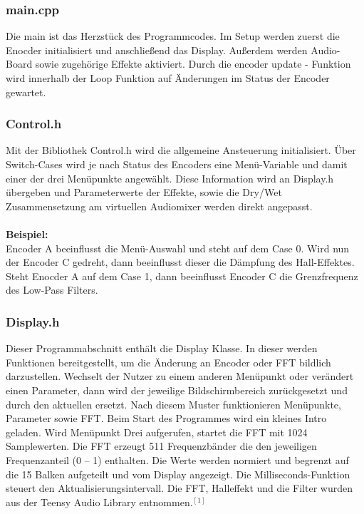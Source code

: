 \documentclass[12pt]{article}
\begin{document}
\subsubsection{main.cpp}
Die main ist das Herzstück des Programmcodes. Im Setup werden zuerst die Enocder initialisiert und anschließend das Display. 
Außerdem werden Audio-Board sowie zugehörige Effekte aktiviert. 
Durch die \glq encoder update\grq{} - Funktion wird innerhalb der Loop Funktion auf Änderungen im Status der Encoder gewartet.
\subsubsection{Control.h}
Mit der Bibliothek \glq Control.h\grq{} wird die allgemeine Ansteuerung initialisiert. 
Über Switch-Cases wird je nach Status des Encoders eine Menü-Variable und damit einer der drei Menüpunkte angewählt. Diese Information wird an \glq Display.h\grq{}   übergeben 
und Parameterwerte der Effekte, sowie die Dry/Wet Zusammensetzung am virtuellen Audiomixer werden direkt angepasst.
\\
\\
\textbf{Beispiel:}
\\
Encoder A beeinflusst die Menü-Auswahl und steht auf dem Case 0. Wird nun der Encoder C gedreht, dann beeinflusst dieser die Dämpfung des Hall-Effektes.
Steht Enocder A auf dem Case 1, dann beeinflusst Encoder C die Grenzfrequenz des Low-Pass Filters.
\subsubsection{Display.h}
Dieser Programmabschnitt enthält die Display Klasse. In dieser werden Funktionen bereitgestellt, um die Änderung an Encoder oder FFT bildlich darzustellen.  
Wechselt der Nutzer zu einem anderen Menüpunkt oder verändert einen Parameter, dann wird der jeweilige Bildschirmbereich zurückgesetzt und durch den aktuellen ersetzt. 
Nach diesem Muster funktionieren Menüpunkte, Parameter sowie FFT. Beim Start des Programmes wird ein kleines Intro geladen.
Wird Menüpunkt Drei aufgerufen, startet die FFT mit 1024 Samplewerten. Die FFT erzeugt 511 Frequenzbänder die den jeweiligen Frequenzanteil (0 – 1) enthalten. 
Die Werte werden normiert und begrenzt auf die 15 Balken aufgeteilt und vom Display angezeigt. 
Die Milliseconds-Funktion steuert den Aktualisierungsintervall.  
Die FFT, Halleffekt und die Filter wurden aus der Teensy Audio Library entnommen.$^{[1]}$
\end{document}

